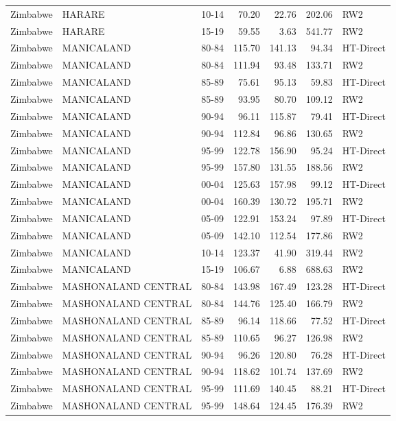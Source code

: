 \begin{longtable}{lllrrrl}
  Zimbabwe & HARARE & 10-14 & 70.20 & 22.76 & 202.06 & RW2 \\ 
  Zimbabwe & HARARE & 15-19 & 59.55 & 3.63 & 541.77 & RW2 \\ 
  Zimbabwe & MANICALAND & 80-84 & 115.70 & 141.13 & 94.34 & HT-Direct \\ 
  Zimbabwe & MANICALAND & 80-84 & 111.94 & 93.48 & 133.71 & RW2 \\ 
  Zimbabwe & MANICALAND & 85-89 & 75.61 & 95.13 & 59.83 & HT-Direct \\ 
  Zimbabwe & MANICALAND & 85-89 & 93.95 & 80.70 & 109.12 & RW2 \\ 
  Zimbabwe & MANICALAND & 90-94 & 96.11 & 115.87 & 79.41 & HT-Direct \\ 
  Zimbabwe & MANICALAND & 90-94 & 112.84 & 96.86 & 130.65 & RW2 \\ 
  Zimbabwe & MANICALAND & 95-99 & 122.78 & 156.90 & 95.24 & HT-Direct \\ 
  Zimbabwe & MANICALAND & 95-99 & 157.80 & 131.55 & 188.56 & RW2 \\ 
  Zimbabwe & MANICALAND & 00-04 & 125.63 & 157.98 & 99.12 & HT-Direct \\ 
  Zimbabwe & MANICALAND & 00-04 & 160.39 & 130.72 & 195.71 & RW2 \\ 
  Zimbabwe & MANICALAND & 05-09 & 122.91 & 153.24 & 97.89 & HT-Direct \\ 
  Zimbabwe & MANICALAND & 05-09 & 142.10 & 112.54 & 177.86 & RW2 \\ 
  Zimbabwe & MANICALAND & 10-14 & 123.37 & 41.90 & 319.44 & RW2 \\ 
  Zimbabwe & MANICALAND & 15-19 & 106.67 & 6.88 & 688.63 & RW2 \\ 
  Zimbabwe & MASHONALAND CENTRAL & 80-84 & 143.98 & 167.49 & 123.28 & HT-Direct \\ 
  Zimbabwe & MASHONALAND CENTRAL & 80-84 & 144.76 & 125.40 & 166.79 & RW2 \\ 
  Zimbabwe & MASHONALAND CENTRAL & 85-89 & 96.14 & 118.66 & 77.52 & HT-Direct \\ 
  Zimbabwe & MASHONALAND CENTRAL & 85-89 & 110.65 & 96.27 & 126.98 & RW2 \\ 
  Zimbabwe & MASHONALAND CENTRAL & 90-94 & 96.26 & 120.80 & 76.28 & HT-Direct \\ 
  Zimbabwe & MASHONALAND CENTRAL & 90-94 & 118.62 & 101.74 & 137.69 & RW2 \\ 
  Zimbabwe & MASHONALAND CENTRAL & 95-99 & 111.69 & 140.45 & 88.21 & HT-Direct \\ 
  Zimbabwe & MASHONALAND CENTRAL & 95-99 & 148.64 & 124.45 & 176.39 & RW2 \\ 

\end{longtable}
